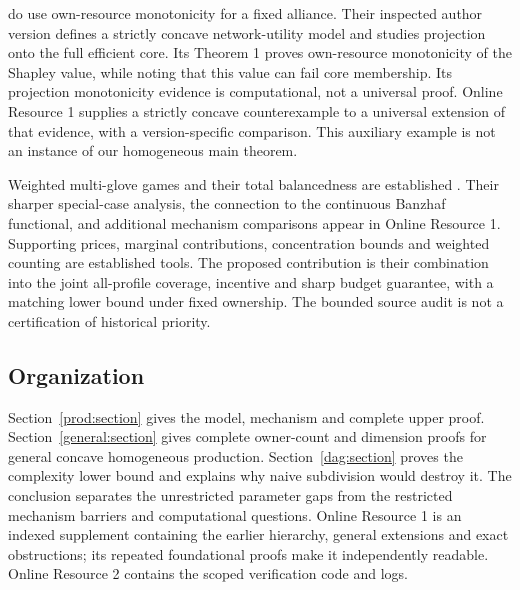 \documentclass[11pt]{article}
\theoremstyle{definition}\newtheorem{definition}[theorem]{Definition}
\theoremstyle{remark}\newtheorem{remark}[theorem]{Remark}
\begin{document}
\citet{ABV} do use own-resource monotonicity for a fixed alliance. Their
inspected author version defines a strictly concave network-utility model
and studies projection onto the full efficient core. Its Theorem 1 proves
own-resource monotonicity of the Shapley value, while noting that this value
can fail core membership. Its projection monotonicity evidence is computational,
not a universal proof. Online
Resource 1 supplies a strictly concave counterexample to a universal
extension of that evidence, with a version-specific comparison. This
auxiliary example is not an instance of our homogeneous main theorem.

Weighted multi-glove games and their total balancedness are established
\citep{MorettiNorde}. Their sharper special-case analysis, the connection to
the continuous Banzhaf functional, and additional mechanism comparisons appear
in Online Resource 1. Supporting prices, marginal contributions, concentration
bounds and weighted counting are established tools. The proposed contribution
is their combination into the joint all-profile coverage, incentive and sharp
budget guarantee, with a matching lower bound under fixed ownership. The
bounded source audit is not a certification of historical priority.

\subsection{Organization}
Section~\ref{prod:section} gives the model, mechanism and complete upper proof.
Section~\ref{general:section} gives complete owner-count and dimension proofs
for general concave homogeneous production. Section~\ref{dag:section} proves
the complexity lower bound and explains why naive subdivision would destroy
it. The conclusion separates the unrestricted parameter gaps from the
restricted mechanism barriers and computational questions. Online Resource 1 is an
indexed supplement containing the earlier hierarchy, general extensions and
exact obstructions; its repeated foundational proofs make it independently
readable. Online Resource 2 contains the scoped verification code and logs.
\end{document}
